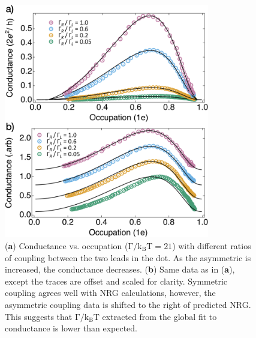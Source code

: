 \begin{figure}[!bht]
  \begin{center}
    \includegraphics[width=0.8\textwidth]{figures/ch3/crop_FiguresMaster.019.png}
    \caption[Conductance vs. Occupation : Varying the coupling symmetry between quantum dot and leads]{\label{fig:ch3/cond_occ_assymetry} 
    (\textbf{a}) Conductance vs. occupation ($\mathrm{\Gamma/k_BT=21}$) with different ratios of coupling between the two leads in the dot. As the asymmetric is increased, the conductance decreases.
    (\textbf{b}) Same data as in (\textbf{a}), except the traces are offset and scaled for clarity. Symmetric coupling agrees well with NRG calculations, however, the asymmetric coupling data is shifted to the right of predicted NRG. This suggests that $\mathrm{\Gamma/k_BT}$ extracted from the global fit to conductance is lower than expected. }
  \end{center}
\end{figure}



